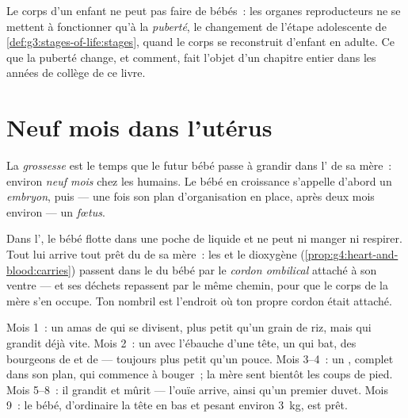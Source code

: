 \begin{remark}\label{rem:g5:human-reproduction:adults}
Le corps d'un enfant ne peut pas faire de bébés~: les organes
reproducteurs ne se mettent à fonctionner qu'à la \emph{puberté}, le
changement de l'étape adolescente de
\cref{def:g3:stages-of-life:stages}, quand le corps se reconstruit
d'enfant en adulte. Ce que la puberté change, et comment, fait
l'objet d'un chapitre entier dans les années de collège de ce livre.
\end{remark}

\section{Neuf mois dans l'utérus}

\begin{definition}[Grossesse]\label{def:g5:human-reproduction:pregnancy}
La \emph{grossesse} est le temps que le futur bébé
passe à grandir dans l' de sa mère~: environ \emph{neuf mois}
chez les humains. Le bébé en croissance s'appelle d'abord un
\emph{embryon}, puis --- une fois son plan
d'organisation en place, après deux mois environ --- un
\emph{fœtus}.
\end{definition}

\begin{proposition}\label{prop:g5:human-reproduction:cord}
Dans l', le bébé flotte dans une poche de liquide et ne peut
ni manger ni respirer. Tout lui arrive tout prêt du  de sa
mère~: les  et le dioxygène
(\cref{prop:g4:heart-and-blood:carries}) passent dans le  du
bébé par le \emph{cordon ombilical} attaché
à son ventre --- et ses déchets repassent par le même chemin, pour
que le corps de la mère s'en occupe. Ton nombril est l'endroit où
ton propre cordon était attaché.
\end{proposition}
\admitted

\begin{example}\label{ex:g5:human-reproduction:timetable}
Mois 1~: un amas de  qui se divisent, plus petit qu'un grain
de riz, mais qui grandit déjà vite. Mois 2~: un  avec
l'ébauche d'une tête, un  qui bat, des bourgeons de  et de
 --- toujours plus petit qu'un pouce. Mois 3--4~: un ,
complet dans son plan, qui commence à bouger~; la mère sent bientôt
les coups de pied. Mois 5--8~: il grandit et mûrit --- l'ouïe
arrive, ainsi qu'un premier duvet. Mois 9~: le bébé, d'ordinaire la
tête en bas et pesant environ \qty{3}{kg}, est prêt.
\end{example}


